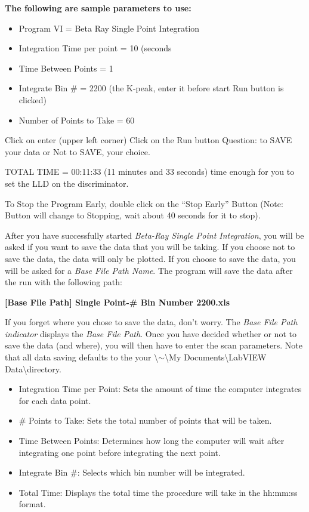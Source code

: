 \documentclass{../lab}
\begin{document}
\textbf{The following are sample parameters to use:}

\begin{itemize}
    \item Program VI = Beta Ray Single Point Integration

    \item Integration Time per point = 10 (seconds

    \item Time Between Points = 1

    \item Integrate Bin \# = 2200 (the K-peak, enter it before start Run button is clicked)

    \item Number of Points to Take = 60
\end{itemize}

Click on enter (upper left corner) Click on the Run button Question: to SAVE your data or Not to SAVE, your choice.

TOTAL TIME = 00:11:33 (11 minutes and 33 seconds) time enough for you to set the LLD on the discriminator.

To Stop the Program Early, double click on the ``Stop Early'' Button (Note: Button will change to Stopping, wait about 40 seconds for it to stop).

After you have successfully started \emph{Beta-Ray Single Point Integration}, you will be asked if you want to save the data that you will be taking. If you choose not to save the data, the data will only be plotted. If you choose to save the data, you will be asked for a \emph{Base File Path Name}. The program will save the data after the run with the following path:

\textbf{[Base File Path] Single Point-\# Bin Number 2200.xls}

If you forget where you chose to save the data, don't worry. The \emph{Base File Path indicator} displays the \emph{Base File Path}. Once you have decided whether or not to save the data (and where), you will then have to enter the scan parameters. Note that all data saving defaults to the your \textbackslash$\sim$\textbackslash My Documents\textbackslash LabVIEW Data\textbackslash directory.

\begin{itemize}
    \item Integration Time per Point: Sets the amount of time the computer integrates for each data point.

    \item \# Points to Take: Sets the total number of points that will be taken.

    \item Time Between Points: Determines how long the computer will wait after integrating one point before integrating the next point.

    \item Integrate Bin \#: Selects which bin number will be integrated.

    \item Total Time: Displays the total time the procedure will take in the hh:mm:ss format.

\end{itemize}
\end{document}

